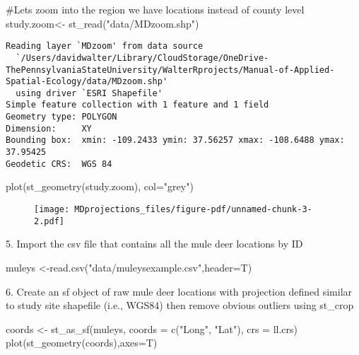\documentclass[
  letterpaper,
]{book}
\newenvironment{Shaded}{\begin{snugshade}}{\end{snugshade}}
\newcommand{\AttributeTok}[1]{\textcolor[rgb]{0.40,0.45,0.13}{#1}}
\newcommand{\CommentTok}[1]{\textcolor[rgb]{0.37,0.37,0.37}{#1}}
\newcommand{\FunctionTok}[1]{\textcolor[rgb]{0.28,0.35,0.67}{#1}}
\newcommand{\NormalTok}[1]{\textcolor[rgb]{0.00,0.23,0.31}{#1}}
\newcommand{\OtherTok}[1]{\textcolor[rgb]{0.00,0.23,0.31}{#1}}
\newcommand{\StringTok}[1]{\textcolor[rgb]{0.13,0.47,0.30}{#1}}
\begin{document}
\begin{Shaded}
\begin{Highlighting}[]
\CommentTok{\#Let\textquotesingle{}s zoom into the region we have locations instead of county level}
\NormalTok{study.zoom}\OtherTok{\textless{}{-}} \FunctionTok{st\_read}\NormalTok{(}\StringTok{"data/MDzoom.shp"}\NormalTok{)}
\end{Highlighting}
\end{Shaded}

\begin{verbatim}
Reading layer `MDzoom' from data source 
  `/Users/davidwalter/Library/CloudStorage/OneDrive-ThePennsylvaniaStateUniversity/WalterRprojects/Manual-of-Applied-Spatial-Ecology/data/MDzoom.shp' 
  using driver `ESRI Shapefile'
Simple feature collection with 1 feature and 1 field
Geometry type: POLYGON
Dimension:     XY
Bounding box:  xmin: -109.2433 ymin: 37.56257 xmax: -108.6488 ymax: 37.95425
Geodetic CRS:  WGS 84
\end{verbatim}

\begin{Shaded}
\begin{Highlighting}[]
\FunctionTok{plot}\NormalTok{(}\FunctionTok{st\_geometry}\NormalTok{(study.zoom), }\AttributeTok{col=}\StringTok{"grey"}\NormalTok{)}
\end{Highlighting}
\end{Shaded}

\begin{figure}[H]

{\centering \texttt{[image: MDprojections\_files/figure-pdf/unnamed-chunk-3-2.pdf]}

}

\end{figure}

5. Import the csv file that contains all the mule deer locations by ID

\begin{Shaded}
\begin{Highlighting}[]
\NormalTok{muleys }\OtherTok{\textless{}{-}}\FunctionTok{read.csv}\NormalTok{(}\StringTok{"data/muleysexample.csv"}\NormalTok{,}\AttributeTok{header=}\NormalTok{T)}
\end{Highlighting}
\end{Shaded}

6. Create an sf object of raw mule deer locations with projection
defined similar to study site shapefile (i.e., WGS84) then remove
obvious outliers using st\_crop

\begin{Shaded}
\begin{Highlighting}[]
\NormalTok{coords }\OtherTok{\textless{}{-}} \FunctionTok{st\_as\_sf}\NormalTok{(muleys, }\AttributeTok{coords =} \FunctionTok{c}\NormalTok{(}\StringTok{"Long"}\NormalTok{, }\StringTok{"Lat"}\NormalTok{), }\AttributeTok{crs =}\NormalTok{ ll.crs)}
\FunctionTok{plot}\NormalTok{(}\FunctionTok{st\_geometry}\NormalTok{(coords),}\AttributeTok{axes=}\NormalTok{T)}
\end{Highlighting}
\end{Shaded}
\end{document}

